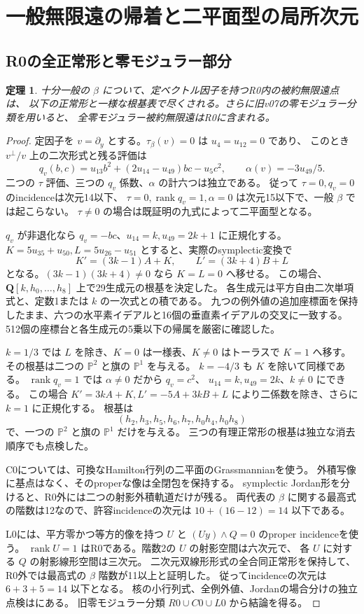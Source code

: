 \documentclass[11pt,a4paper]{ltjsarticle}
\newcommand{\QQ}{\mathbf Q}
\newtheorem{theorem}{定理}[section]
\theoremstyle{remark}
\begin{document}
\section{一般無限遠の帰着と二平面型の局所次元}
\subsection{R0の全正常形と零モジュラー部分}
\begin{theorem}\label{thm:r0-exhaustion-v33}
十分一般の $\beta$ について、定ベクトル因子を持つR0内の被約無限遠点は、
以下の正常形と一様な根基表で尽くされる。さらに旧v07の零モジュラー分類を用いると、
全零モジュラー被約無限遠はR0に含まれる。
\end{theorem}
\begin{proof}
定因子を $v=\partial_y$ とする。$\tau_\beta(v)=0$ は $u_4=u_{12}=0$ であり、
このとき $v^\perp/v$ 上の二次形式と残る評価は
\[
 q_v(b,c)=u_{13}b^2+(2u_{14}-u_{49})bc-u_5c^2,
 \qquad \alpha(v)=-3u_{49}/5.
\]
二つの $\tau$ 評価、三つの $q_v$ 係数、$\alpha$ の計六つは独立である。
従って $\tau=0,q_v=0$ のincidenceは次元14以下、
$\tau=0,\operatorname{rank}q_v=1,\alpha=0$ は次元15以下で、一般 $\beta$ では起こらない。
$\tau\ne0$ の場合は既証明の九式によって二平面型となる。

$q_v$ が非退化なら $q_v=-bc$、$u_{14}=k,u_{49}=2k+1$ に正規化する。
$K=5u_{35}+u_{50},L=5u_{26}-u_{51}$ とすると、実際のsymplectic変換で
\[
 K'=(3k-1)A+K,\qquad L'=(3k+4)B+L
\]
となる。$(3k-1)(3k+4)\ne0$ なら $K=L=0$ へ移せる。
この場合、$\QQ[k,h_0,\ldots,h_8]$ 上で29生成元の根基を決定した。
各生成元は平方自由二次単項式と、定数1または $k$ の一次式との積である。
九つの例外値の追加座標面を保持したまま、六つの水平素イデアルと16個の垂直素イデアルの交叉に一致する。
512個の座標台と各生成元の5乗以下の帰属を厳密に確認した\cite{r0-exhaustion-v33}。

$k=1/3$ では $L$ を除き、$K=0$ は一様表、$K\ne0$ はトーラスで $K=1$ へ移す。
その根基は二つの $\mathbb P^2$ と旗の $\mathbb P^1$ を与える。
$k=-4/3$ も $K$ を除いて同様である。
$\operatorname{rank}q_v=1$ では $\alpha\ne0$ だから $q_v=c^2$、
$u_{14}=k,u_{49}=2k$、$k\ne0$ にできる。
この場合 $K'=3kA+K,L'=-5A+3kB+L$ により二係数を除き、さらに $k=1$ に正規化する。
根基は
\[
 (h_2,h_3,h_5,h_6,h_7,h_0h_4,h_0h_8)
\]
で、一つの $\mathbb P^2$ と旗の $\mathbb P^1$ だけを与える。
三つの有理正常形の根基は独立な消去順序でも点検した。

C0については、可換なHamilton行列の二平面のGrassmannianを使う。
外積写像に基点はなく、そのproperな像は全閉包を保持する。
symplectic Jordan形を分けると、R0外には二つの射影外積軌道だけが残る。
両代表の $\beta$ に関する最高式の階数は12なので、許容incidenceの次元は
$10+(16-12)=14$ 以下である。

L0には、平方零かつ等方的像を持つ $U$ と $(Uy)\wedge Q=0$ のproper incidenceを使う。
$\operatorname{rank}U=1$ はR0である。階数2の $U$ の射影空間は六次元で、
各 $U$ に対する $Q$ の射影線形空間は三次元。
二次元双線形形式の全合同正常形を保持して、R0外では最高式の $\beta$ 階数が11以上と証明した。
従ってincidenceの次元は $6+3+5=14$ 以下となる。
核の小行列式、全例外値、Jordanの場合分けの独立点検は\cite{zero-modular-v33}にある。
旧零モジュラー分類 $R0\cup C0\cup L0$ から結論を得る。
\end{proof}
\end{document}
